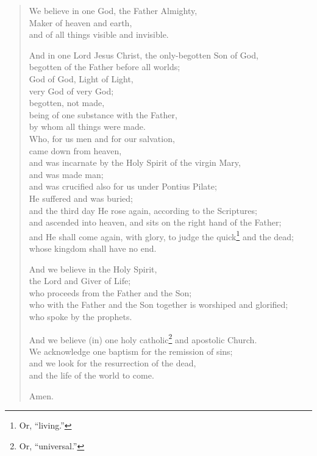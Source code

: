 \documentclass[
]{book}
\begin{document}
\begin{quote}
We believe in one God, the Father Almighty,\\
Maker of heaven and earth,\\
and of all things visible and invisible.

And in one Lord Jesus Christ, the only-begotten Son of God,\\
begotten of the Father before all worlds;\\
God of God, Light of Light,\\
very God of very God;\\
begotten, not made,\\
being of one substance with the Father,\\
by whom all things were made.\\
Who, for us men and for our salvation,\\
came down from heaven,\\
and was incarnate by the Holy Spirit of the virgin Mary,\\
and was made man;\\
and was crucified also for us under Pontius Pilate;\\
He suffered and was buried;\\
and the third day He rose again, according to the Scriptures;\\
and ascended into heaven, and sits on the right hand of the Father;\\
and He shall come again, with glory, to judge the quick\footnote{Or, ``living.''} and the dead;\\
whose kingdom shall have no end.

And we believe in the Holy Spirit,\\
the Lord and Giver of Life;\\
who proceeds from the Father and the Son;\\
who with the Father and the Son together is worshiped and glorified;\\
who spoke by the prophets.

And we believe (in) one holy catholic\footnote{Or, ``universal.''} and apostolic Church.\\
We acknowledge one baptism for the remission of sins;\\
and we look for the resurrection of the dead,\\
and the life of the world to come.

Amen.
\end{quote}
\end{document}
